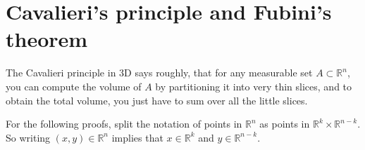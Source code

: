 \section{Cavalieri's principle and Fubini's theorem}


The Cavalieri principle in 3D says roughly, that for any measurable set $A \subset \mathbb{R}^{n}$, you can compute the volume of $A$ by partitioning it into very thin slices, and to obtain the total volume, you just have to sum over all the little slices.

For the following proofs, split the notation of points in $\mathbb{R}^{n}$ as points in $\mathbb{R}^{k} \times \mathbb{R}^{n-k}$. So writing $(x,y) \in \mathbb{R}^{n}$ implies that $x \in \mathbb{R}^{k}$ and $y \in \mathbb{R}^{n-k}$.

